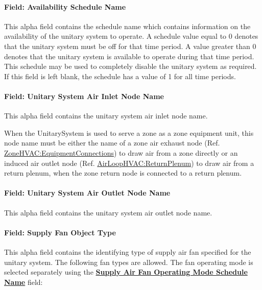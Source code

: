 \paragraph{Field: Availability Schedule Name}\label{field-availability-schedule-name-017}

This alpha field contains the schedule name which contains information on the availability of the unitary system to operate. A schedule value equal to 0 denotes that the unitary system must be off for that time period. A value greater than 0 denotes that the unitary system is available to operate during that time period. This schedule may be used to completely disable the unitary system as required. If this field is left blank, the schedule has a value of 1 for all time periods.

\paragraph{Field: Unitary System Air Inlet Node Name}\label{field-unitary-system-air-inlet-node-name}

This alpha field contains the unitary system air inlet node name.

When the UnitarySystem is used to serve a zone as a zone equipment unit, this node name must be either the name of a zone air exhaust node (Ref. \hyperref[zonehvacequipmentconnections]{ZoneHVAC:EquipmentConnections}) to draw air from a zone directly or an induced air outlet node (Ref. \hyperref[airloophvacreturnplenum]{AirLoopHVAC:ReturnPlenum}) to draw air from a return plenum, when the zone return node is connected to a return plenum.

\paragraph{Field: Unitary System Air Outlet Node Name}\label{field-unitary-system-air-outlet-node-name}

This alpha field contains the unitary system air outlet node name.

\paragraph{Field: Supply Fan Object Type}\label{field-supply-fan-object-type-000}

This alpha field contains the identifying type of supply air fan specified for the unitary system. The following fan types are allowed. The fan operating mode is selected separately using the \textbf{\hyperref[supply-air-fan-operating-mode-schedule-name]{Supply Air Fan Operating Mode Schedule Name}} field:

